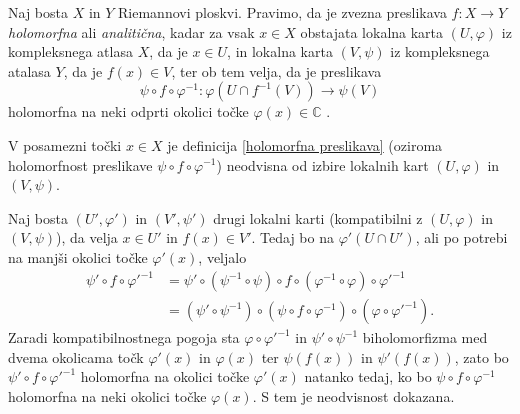 \documentclass[mat1]{fmfdelo}
\numberwithin{equation}{section}
\newcommand{\C}{\mathbb C}
\newcommand{\inv}{^{-1}}
\theoremstyle{definition}
\begin{document}


\begin{definicija}
    \label{holomorfna preslikava}
    Naj bosta $X$ in $Y$ Riemannovi ploskvi. Pravimo, da je zvezna preslikava $f:X \to Y$ \emph{holomorfna} ali \emph{analitična}, kadar za vsak $x \in X$ obstajata lokalna karta $(U, \varphi)$ iz kompleksnega atlasa $X$, da je $x \in U$, in lokalna karta $(V, \psi)$ iz kompleksnega atalasa $Y$, da je $f(x) \in V$, ter ob tem velja, da je preslikava  
    \[
        \psi \circ f \circ \varphi\inv : \varphi(U \cap f\inv(V)) \to \psi(V)
    \]
    holomorfna na neki odprti okolici točke $\varphi(x) \in \C$ .
\end{definicija}

\begin{trditev}
    V posamezni točki $x \in X$ je definicija \ref{holomorfna preslikava} (oziroma holomorfnost preslikave $\psi \circ f \circ \varphi\inv$) neodvisna od izbire lokalnih kart $(U, \varphi)$ in $(V, \psi)$. 
\end{trditev}

\begin{dokaz}
    Naj bosta $(U', \varphi')$ in $(V', \psi')$ drugi lokalni karti (kompatibilni z $(U, \varphi)$ in $(V, \psi)$), da velja $x \in U'$ in $f(x) \in V'$. Tedaj bo na $\varphi'(U \cap U')$, ali po potrebi na manjši okolici točke $\varphi'(x)$, veljalo
    \begin{align*}    
        \psi' \circ f \circ {\varphi'}\inv &= 
        \psi' \circ (\psi\inv \circ \psi) \circ f \circ (\varphi\inv \circ \varphi) \circ {\varphi'}\inv \\
        &= (\psi' \circ \psi\inv) \circ (\psi \circ f \circ \varphi\inv) \circ (\varphi \circ {\varphi'}\inv).
    \end{align*}
    Zaradi kompatibilnostnega pogoja sta $\varphi \circ {\varphi'}\inv$ in $\psi' \circ \psi\inv$ biholomorfizma med dvema okolicama točk $\varphi'(x)$ in $\varphi(x)$ ter $\psi(f(x))$ in $\psi'(f(x))$, zato bo $\psi' \circ f \circ {\varphi'}\inv$ holomorfna na okolici točke $\varphi'(x)$ natanko tedaj, ko bo $\psi \circ f \circ \varphi\inv$ holomorfna na neki okolici točke $\varphi(x)$. S tem je neodvisnost dokazana. 
\end{dokaz}
\end{document}
